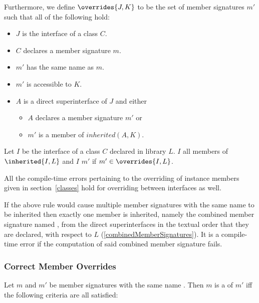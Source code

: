\documentclass[makeidx]{article}
\begin{document}
\LMHash{}%
Furthermore, we define $\overrides{J, K}$ to be
the set of member signatures $m'$
such that all of the following hold:
\begin{itemize}
\item $J$ is the interface of a class $C$.
\item $C$ declares a member signature $m$.
\item $m'$ has the same name as $m$.
\item $m'$ is accessible to $K$.
\item $A$ is a direct superinterface of $J$ and either
  \begin{itemize}
  \item $A$ declares a member signature $m'$ or
  \item $m'$ is a member of $inherited(A, K)$.
  \end{itemize}
\end{itemize}

\LMHash{}%
Let $I$ be the interface of a class $C$ declared in library $L$.
$I$  all members of $\inherited{I, L}$
and $I$  $m'$ if $m' \in \overrides{I, L}$.

\LMHash{}%
All the compile-time errors pertaining to the overriding of instance members
given in section~\ref{classes} hold for overriding between interfaces as well.

\LMHash{}%
If the above rule would cause multiple member signatures
with the same name \id{} to be inherited then
exactly one member is inherited, namely
the combined member signature named \id{},
from the direct superinterfaces
in the textual order that they are declared,
with respect to $L$
(\ref{combinedMemberSignatures}).
It is a compile-time error
if the computation of said combined member signature fails.


\subsubsection{Correct Member Overrides}

\LMHash{}%
Let $m$ and $m'$ be member signatures with the same name \id.
Then $m$ is a  of $m'$
if{}f the following criteria are all satisfied:
\end{document}
